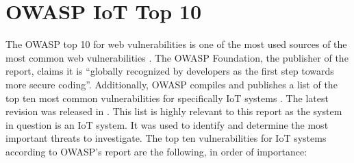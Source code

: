 \section{OWASP IoT Top 10} \label{ch:method:owasp}
The OWASP top 10 for web vulnerabilities is one of the most used sources of the most common web vulnerabilities \cite{owasp-www-top10}. The OWASP Foundation, the publisher of the report, claims it is \enquote{globally recognized by developers as the first step towards more secure coding}. Additionally, OWASP compiles and publishes a list of the top ten most common vulnerabilities for specifically IoT systems \cite{owasp-iot-top10}. The latest revision was released in \citeyear{owasp-iot-top10}. This list is highly relevant to this report as the system in question is an IoT system. It was used to identify and determine the most important threats to investigate. The top ten vulnerabilities for IoT systems according to OWASP's report are the following, in order of importance:
